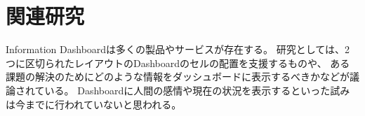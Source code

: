 \section{関連研究}

Information Dashboardは多くの製品やサービスが存在する。
研究としては、2つに区切られたレイアウトのDashboardのセルの配置を支援するもの\cite{Hertzog:2015:BSP:2678025.2701383}や、
ある課題の解決のためにどのような情報をダッシュボードに表示するべきか\cite{Jones:2015:ECI:2800835.2800963}などが議論されている。
Dashboardに人間の感情や現在の状況を表示するといった試みは今までに行われていないと思われる。